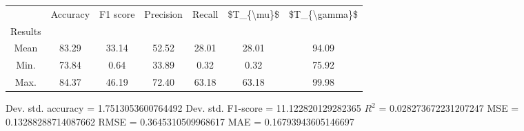\begin{tabular}{|c|c|c|c|c|c|c|}
\toprule
{} &  Accuracy &  F1 score &  Precision &  Recall &  \$T\_\{\textbackslash mu\}\$ &  \$T\_\{\textbackslash gamma\}\$ \\
Results &           &           &            &         &            &               \\
\hline
Mean    &     83.29 &     33.14 &      52.52 &   28.01 &      28.01 &         94.09 \\
Min.    &     73.84 &      0.64 &      33.89 &    0.32 &       0.32 &         75.92 \\
Max.    &     84.37 &     46.19 &      72.40 &   63.18 &      63.18 &         99.98 \\
\bottomrule
\end{tabular}

 Dev. std. accuracy = 1.7513053600764492
 Dev. std. F1-score = 11.122820129282365
 $R^2$ = 0.028273672231207247
 MSE = 0.13288288714087662
 RMSE = 0.3645310509968617
 MAE = 0.16793943605146697